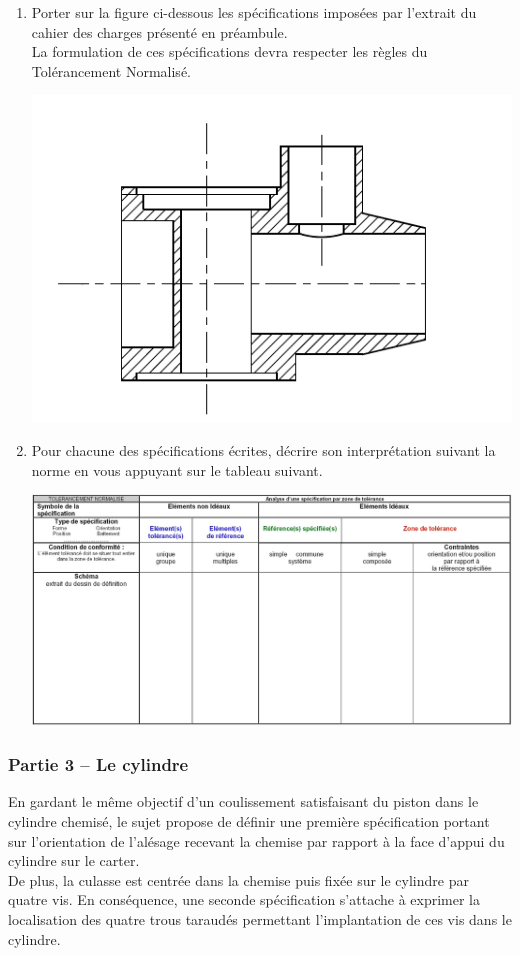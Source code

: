 \begin{enumerate}
\item Porter sur la figure ci-dessous les spécifications imposées par l'extrait du cahier des charges
présenté en préambule.\\
La formulation de ces spécifications devra respecter les règles du Tolérancement Normalisé.

\begin{center}
\includegraphics[scale=0.6]{png/carter2.png}
\end{center}

\item Pour chacune des spécifications écrites, décrire son interprétation suivant la norme en vous appuyant sur le tableau suivant.

\begin{center}
\includegraphics[scale=0.55]{png/doc_rep.png}
\end{center}
\end{enumerate}

\newpage
\subsubsection{Partie 3 -- Le cylindre}
En gardant le même objectif d'un coulissement satisfaisant du piston dans le cylindre chemisé, le sujet propose de définir une première spécification portant sur l'orientation de l'alésage recevant la chemise par rapport à la face d'appui du cylindre sur le carter.\\
De plus, la culasse est centrée dans la chemise puis fixée sur le cylindre par quatre vis. En conséquence, une seconde spécification s'attache à exprimer la localisation des quatre trous taraudés permettant l'implantation de ces vis dans le cylindre.

